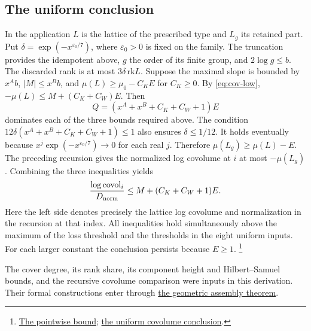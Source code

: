 \subsection{The uniform conclusion}
In the application \(L\) is the lattice of the prescribed type and
\(L_g\) its retained part. Put \(\delta=\exp(-x^{\varepsilon_0/7})\),
where \(\varepsilon_0>0\) is fixed on the family. The truncation
provides the idempotent above, \(g\) the order of its finite group,
and \(2\log g\le b\). The discarded rank is at most \(3\delta\,\mathrm{rk}L\).
Suppose the maximal slope is bounded by \(x^A b\), \(|M|\le x^B b\),
and \(\mu(L)\ge\mu_0-C_KE\) for \(C_K\ge0\). By \eqref{eq:cov-low},
\(-\mu(L)\le M+(C_K+C_W)E\). Then
\[
 Q=(x^A+x^B+C_K+C_W+1)E
\]
dominates each of the three bounds required above. The condition
\(12\delta(x^A+x^B+C_K+C_W+1)\le1\) also ensures \(\delta\le1/12\).
It holds eventually because \(x^j\exp(-x^{\varepsilon_0/7})\to0\)
for each real \(j\). Therefore \(\mu(L_g)\ge\mu(L)-E\).
The preceding recursion gives the normalized log covolume at \(i\)
at most \(-\mu(L_g)\). Combining the three inequalities yields
\[
  \frac{\log\operatorname{covol}_i}{D_{\rm norm}}
      \le M+(C_K+C_W+1)E .
\]
Here the left side denotes precisely the lattice log covolume and
normalization in the recursion at that index. All inequalities hold
simultaneously above the maximum of the loss threshold and the
thresholds in the eight uniform inputs. For each larger constant the
conclusion persists because \(E\ge1\).
\footnote{\href{https://github.com/Deicyde/riemann-hypothesis/blob/40e56bab/src/Development/AbelianVarietyTheory/Proofs/DivisorProofs/CovolumeFromGramAndBounds.lean}{The pointwise bound};
\href{https://github.com/Deicyde/riemann-hypothesis/blob/40e56bab/src/Development/AutomorphicArithmetic/ThetaCorrespondence/ThetaPairLifts/ThirdPlaceSeries/CovolXOfSteps.lean}{the uniform covolume conclusion}.}

The cover degree, its rank share, its component height and
Hilbert--Samuel bounds, and the recursive covolume comparison were
inputs in this derivation. Their formal constructions enter through
\href{https://github.com/Deicyde/riemann-hypothesis/blob/40e56bab/src/Development/AutomorphicArithmetic/ThetaCorrespondence/ThetaPairLifts/ThirdPlaceSeries/TopCovolG.lean}{the geometric assembly theorem}.
